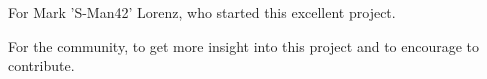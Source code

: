 For Mark 'S-Man42' Lorenz, who started this excellent project.

For the community, to get more insight into this project and to encourage to contribute. 